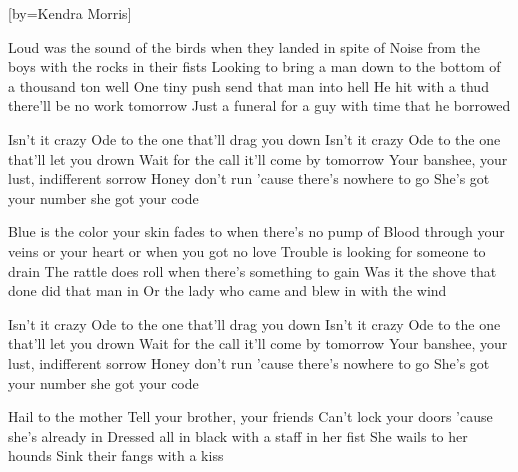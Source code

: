 [by={Kendra Morris}]


  \beginverse
  Loud was the sound of the birds when they landed in spite of
  Noise from the boys with the rocks in their fists
  Looking to bring a man down to the bottom of a thousand ton well
  One tiny push send that man into hell
  He hit with a thud there'll be no work tomorrow
  Just a funeral for a guy with time that he borrowed
  \endverse

  \beginchorus
  Isn't it crazy
  Ode to the one that'll drag you down
  Isn't it crazy
  Ode to the one that'll let you drown
  Wait for the call it'll come by tomorrow
  Your banshee, your lust, indifferent sorrow
  Honey don't run 'cause there's nowhere to go
  She's got your number she got your code
  \endchorus

  \chordsoff
  \beginverse
  Blue is the color your skin fades to when there's no pump of
  Blood through your veins or your heart or when you got no love
  Trouble is looking for someone to drain
  The rattle does roll when there's something to gain
  Was it the shove that done did that man in
  Or the lady who came and blew in with the wind
  \endverse

  \beginchorus
  Isn't it crazy
  Ode to the one that'll drag you down
  Isn't it crazy
  Ode to the one that'll let you drown
  Wait for the call it'll come by tomorrow
  Your banshee, your lust, indifferent sorrow
  Honey don't run 'cause there's nowhere to go
  She's got your number she got your code
  \endchorus

  
  \beginverse
  Hail to the mother
  Tell your brother, your friends
  Can't lock your doors 'cause she's already in
  Dressed all in black with a staff in her fist
  She wails to her hounds
  Sink their fangs with a kiss
  \endverse


\endsong
